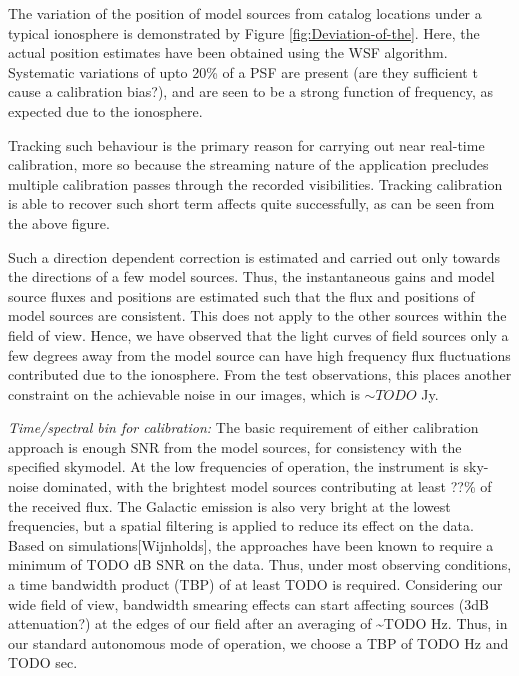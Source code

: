 \documentclass{aa}
\begin{document}
The variation  of the position of  model sources from catalog  locations under a
typical ionosphere is  demonstrated by Figure \ref{fig:Deviation-of-the}.  Here,
the   actual   position   estimates   have   been   obtained   using   the   WSF
algorithm. Systematic  variations of upto  20\% of a  PSF are present  (are they
sufficient t cause a calibration bias?), and are seen to be a strong function of
frequency, as expected due to the ionosphere.




Tracking such  behaviour is the primary  reason for carrying  out near real-time
calibration, more so  because the streaming nature of  the application precludes
multiple  calibration   passes  through  the   recorded  visibilities.  Tracking
calibration is  able to recover such  short term affects  quite successfully, as
can be seen from the above figure.

Such a direction dependent correction  is estimated and carried out only towards
the directions of  a few model sources. Thus, the  instantaneous gains and model
source fluxes  and positions are estimated  such that the flux  and positions of
model sources  are consistent. This does  not apply to the  other sources within
the  field of  view. Hence,  we have  observed that  the light  curves  of field
sources only  a few degrees away from  the model source can  have high frequency
flux fluctuations contributed due to the ionosphere. From the test observations,
this places another  constraint on the achievable noise in  our images, which is
$\sim TODO$ Jy.

\emph{Time/spectral  bin  for  calibration:  }The basic  requirement  of  either
calibration approach is enough SNR  from the model sources, for consistency with
the specified skymodel.  At the low frequencies of  operation, the instrument is
sky-noise dominated, with the brightest model sources contributing at least ??\%
of the  received flux. The Galactic emission  is also very bright  at the lowest
frequencies, but  a spatial  filtering is  applied to reduce  its effect  on the
data.  Based on simulations{[}Wijnholds{]},  the approaches  have been  known to
require  a minimum  of  TODO dB  SNR on  the  data. Thus,  under most  observing
conditions,   a   time  bandwidth   product   (TBP)   of   at  least   TODO   is
required. Considering  our wide  field of view,  bandwidth smearing  effects can
start affecting  sources (3dB attenuation?) at  the edges of our  field after an
averaging of \textasciitilde{}TODO Hz. Thus,  in our standard autonomous mode of
operation, we choose a TBP of TODO Hz and TODO sec.
\end{document}
